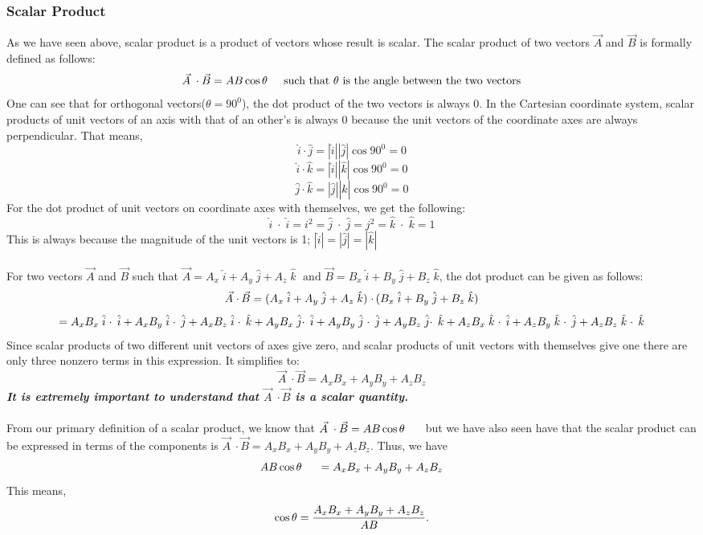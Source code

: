 \documentclass[9pt]{exam}
\begin{document}
\subsubsection*{Scalar Product}
As we have seen above, scalar product is a product of vectors whose result is scalar. The scalar product of two vectors $\vec{A}$ and $\vec{B}$ is formally defined as follows:
$$\vec{A}\; \cdot \vec{B} = AB \cos \theta\hspace{0.2in}\text{such that }\theta\text{ is the angle between the two vectors}$$
One can see that for orthogonal vectors($\theta=90^0$), the dot product of the two vectors is always 0. In the Cartesian coordinate system, scalar products of unit vectors of an axis with that of an other's is always 0 because the unit vectors of the coordinate axes are always perpendicular. That means,
$$\hat{i}\cdot\hat{j}=|\hat{i}||\hat{j}|\cos90^0=0$$
$$\hat{i}\cdot\hat{k}=|\hat{i}||\hat{k}|\cos90^0=0$$
$$\hat{j}\cdot\hat{k}=|\hat{j}||\hat{k}|\cos90^0=0$$
For the dot product of unit vectors on coordinate axes with themselves, we get the following:
$$\hat{i}\; \cdotp\; \hat{i} = i^{2} = \hat{j}\; \cdotp\; \hat{j} = j^{2} = \hat{k}\; \cdotp\; \hat{k} = 1 $$
This is always because the magnitude of the unit vectors is 1; $|\hat{i}| = |\hat{j}| = |\hat{k}|$ \\ \\
For two vectors $\vec{A}$ and $\vec{B}$ such that $\vec{A} = A_{x}\; \hat{i} + A_{y}\; \hat{j} + A_{z}\; \hat{k}\; \text{ and } \vec{B} = B_{x}\; \hat{i} + B_{y}\; \hat{j} + B_{z}\; \hat{k}$, the dot product can be given as follows:
$$\vec{A}\; \cdotp \vec{B} = (A_{x}\; \hat{i} + A_{y}\; \hat{j} + A_{z}\; \hat{k})\; \cdotp (B_{x}\; \hat{i} + B_{y}\; \hat{j} + B_{z}\; \hat{k}) \\ $$
$$= A_{x}B_{x}\; \hat{i}\; \cdotp\; \hat{i} + A_{x}B_{y}\; \hat{i}\; \cdotp\; \hat{j} + A_{x}B_{z}\; \hat{i}\; \cdotp\; \hat{k} \\ + A_{y}B_{x}\; \hat{j} \cdotp\; \hat{i} + A_{y}B_{y}\; \hat{j}\; \cdotp\; \hat{j} + A_{y}B_{z}\; \hat{j} \cdotp\; \hat{k} \\ + A_{z}B_{x}\; \hat{k}\; \cdotp\; \hat{i} + A_{z}B_{y}\; \hat{k}\; \cdotp\; \hat{j} + A_{z}B_{z}\; \hat{k}\; \cdotp\; \hat{k}$$
Since scalar products of two different unit vectors of axes give zero, and scalar products of unit vectors with themselves give one there are only three nonzero terms in this expression. It simplifies to:
$$\vec{A}\; \cdotp \vec{B} = A_{x}B_{x} + A_{y}B_{y} + A_{z}B_{z}$$
\textbf{\textit{It is extremely important to understand that $\vec{A}\; \cdotp \vec{B}$ is a scalar quantity.}} \\ \\
From our primary definition of a scalar product, we know that $\vec{A}\; \cdot \vec{B} = AB \cos \theta\hspace{0.2in}$ but we have also seen have that the scalar product can be expressed in terms of the components is $\vec{A}\; \cdotp \vec{B} = A_{x}B_{x} + A_{y}B_{y} + A_{z}B_{z}$. Thus, we have 
$$ AB \cos \theta\hspace{0.2in} = A_{x}B_{x} + A_{y}B_{y} + A_{z}B_{z}$$
This means, 
$$\cos \theta  = \dfrac{A_{x}B_{x} + A_{y}B_{y} + A_{z}B_{z}}{AB} \ldotp \label{2.34}$$
\end{document}
